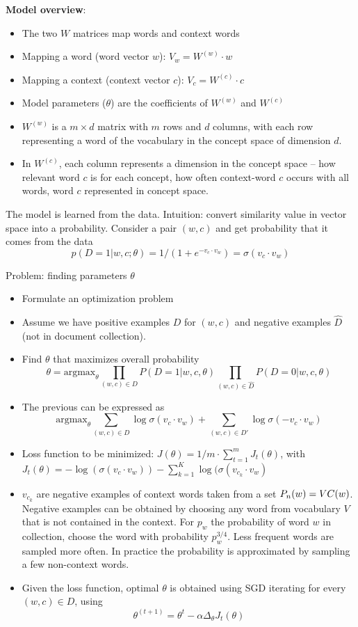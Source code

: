   \textbf{Model overview}:
  \begin{itemize}
    \item The two $W$ matrices map words and context words
    \item Mapping a word (word vector $w$): $V_w = W^{(w)}\cdot w$
    \item Mapping a context (context vector $c$): $V_c = W^{(c)}\cdot c$
    \item Model parameters ($\theta$) are the coefficients of $W^{(w)}$ and $W^{(c)}$
    \item $W^{(w)}$ is a $m\times d$ matrix with $m$ rows and $d$ columns, with each row representing a word of the vocabulary in the concept space of dimension $d$.
    \item In $W^{(c)}$, each column represents a dimension in the concept space -- how relevant word $c$ is for each concept, how often context-word $c$ occurs with all words, word $c$ represented in concept space.
  \end{itemize}

  The model is learned from the data. Intuition: convert similarity value in vector space into a probability. Consider a pair $(w,c)$ and get probability that it comes from the data $$p(D=1|w,c;\theta)=1/(1+e^{-v_c\cdot v_w})=\sigma(v_c\cdot v_w)$$

  Problem: finding parameters $\theta$
  \begin{itemize}
    \item Formulate an optimization problem
    \item Assume we have positive examples $D$ for $(w,c)$ and negative examples $\hat{D}$ (not in document collection).
    \item Find $\theta$ that maximizes overall probability $$\theta=\text{argmax}_\theta \prod_{(w,c)\in D}{P(D=1|w,c,\theta)}\prod_{(w,c)\in \hat{D}}{P(D=0|w,c,\theta)}$$
    \item The previous can be expressed as $$\text{argmax}_\theta\sum_{(w,c)\in D}{\log{\sigma(v_c\cdot v_w)}} + \sum_{(w,c)\in D'}{\log{\sigma(-v_c\cdot v_w)}}$$
    \item Loss function to be minimized: $J(\theta)=1/m\cdot\sum_{t=1}^{m}{J_t(\theta)}$, with $J_t(\theta)=-\log{(\sigma(v_c\cdot v_w))}-\sum_{k=1}^{K}{\log{(\sigma(v_{c_k}\cdot v_w)}}$
    \item $v_{c_k}$ are negative examples of context words taken from a set $P_n(w)=V\\C(w)$. Negative examples can be obtained by choosing any word from vocabulary $V$ that is not contained in the context. For $p_w$ the probability of word $w$ in collection, choose the word with probability $p_w^{3/4}$. Less frequent words are sampled more often. In practice the probability is approximated by sampling a few non-context words.
    \item Given the loss function, optimal $\theta$ is obtained using SGD iterating for every $(w,c)\in D$, using $$\theta^{(t+1)}=\theta^t-\alpha\Delta_\theta J_t(\theta)$$
  \end{itemize}

